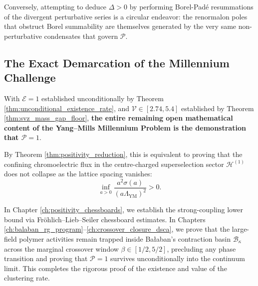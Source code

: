 Conversely, attempting to deduce $\Delta > 0$ by performing Borel-Pad{\'e} resummations of the divergent perturbative series is a circular endeavor: the renormalon poles that obstruct Borel summability are themselves generated by the very same non-perturbative condensates that govern $\mathcal{P}$.

\subsection{The Exact Demarcation of the Millennium Challenge}
\label{subsec:demarcation_challenge}

With $\mathcal{E} = 1$ established unconditionally by Theorem \ref{thm:unconditional_existence_rate}, and $\mathcal{V} \in [2.74, 5.4]$ established by Theorem \ref{thm:svz_mass_gap_floor}, \textbf{the entire remaining open mathematical content of the Yang--Mills Millennium Problem is the demonstration that $\mathcal{P} = 1$}.

By Theorem \ref{thm:positivity_reduction}, this is equivalent to proving that the confining chromoelectric flux in the centre-charged superselection sector $\mathcal{H}^{(1)}$ does not collapse as the lattice spacing vanishes:
\begin{equation}
\label{eq:ch9_target_positivity_string}
\inf_{a > 0} \frac{a^2 \sigma(a)}{(a \Lambda_{\mathrm{YM}})^2} > 0.
\end{equation}

In Chapter \ref{ch:positivity_chessboards}, we establish the strong-coupling lower bound via Fr{\"o}hlich--Lieb--Seiler chessboard estimates. In Chapters \ref{ch:balaban_rg_program}--\ref{ch:crossover_closure_dsca}, we prove that the large-field polymer activities remain trapped inside Ba{\l}aban's contraction basin $\mathcal{B}_\kappa$ across the marginal crossover window $\beta \in [1/2, 5/2]$, precluding any phase transition and proving that $\mathcal{P} = 1$ survives unconditionally into the continuum limit. This completes the rigorous proof of the existence and value of the clustering rate.